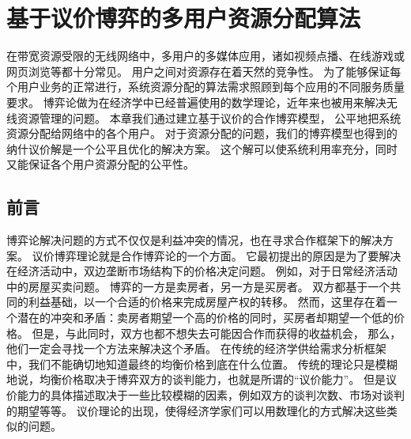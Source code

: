 \graphicspath{ {../body/nash_bargaining_figures/} }
\chapter{基于议价博弈的多用户资源分配算法}
在带宽资源受限的无线网络中，多用户的多媒体应用，诸如视频点播、在线游戏或网页浏览等都十分常见。
用户之间对资源存在着天然的竞争性。
为了能够保证每个用户业务的正常进行，系统资源分配的算法需求照顾到每个应用的不同服务质量要求。
博弈论做为在经济学中已经普遍使用的数学理论，近年来也被用来解决无线资源管理的问题。
本章我们通过建立基于议价的合作博弈模型，
公平地把系统资源分配给网络中的各个用户。
对于资源分配的问题，我们的博弈模型也得到的纳什议价解是一个公平且优化的解决方案。
这个解可以使系统利用率充分，同时又能保证各个用户资源分配的公平性。

\section{前言}
博弈论解决问题的方式不仅仅是利益冲突的情况，也在寻求合作框架下的解决方案。
议价博弈理论就是合作博弈论的一个方面。
它最初提出的原因是为了要解决在经济活动中，双边垄断市场结构下的价格决定问题。
例如，对于日常经济活动中的房屋买卖问题。
博弈的一方是卖房者，另一方是买房者。
双方都基于一个共同的利益基础，以一个合适的价格来完成房屋产权的转移。
然而，这里存在着一个潜在的冲突和矛盾：卖房者期望一个高的价格的同时，买房者却期望一个低的价格。
但是，与此同时，双方也都不想失去可能因合作而获得的收益机会，
那么，他们一定会寻找一个方法来解决这个矛盾。
在传统的经济学供给需求分析框架中，我们不能确切地知道最终的均衡价格到底在什么位置。
传统的理论只是模糊地说，均衡价格取决于博弈双方的谈判能力，也就是所谓的“议价能力”。
但是议价能力的具体描述取决于一些比较模糊的因素，例如双方的谈判次数、市场对谈判的期望等等。
议价理论的出现，使得经济学家们可以用数理化的方式解决这些类似的问题。

